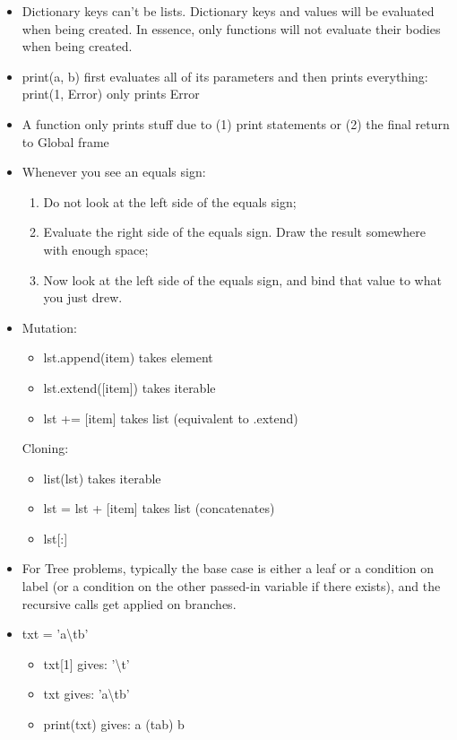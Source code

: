 \documentclass{article}
\begin{document}
\begin{itemize}
	\item Dictionary keys can't be lists. Dictionary keys and values will be evaluated when being created. In essence, only functions will not evaluate their bodies when being created.
	\item print(a, b) first evaluates all of its parameters and then prints everything: print(1, Error) only prints Error
	\item A function only prints stuff due to (1) print statements or (2) the final return to Global frame
	\item Whenever you see an equals sign:
	\begin{enumerate}
		\item Do not look at the left side of the equals sign;
		\item Evaluate the right side of the equals sign. Draw the result somewhere with enough space;
		\item Now look at the left side of the equals sign, and bind that value to what you just drew.
	\end{enumerate}
	\item Mutation:
	\begin{itemize}
		\item lst.append(item) takes element
		\item lst.extend([item]) takes iterable
		\item lst += [item] takes list (equivalent to .extend)
	\end{itemize}
	Cloning:
	\begin{itemize}
		\item list(lst) takes iterable
		\item lst = lst + [item] takes list (concatenates)
		\item lst[:]
	\end{itemize}
	\item For Tree problems, typically the base case is either a leaf or a condition on label (or a condition on the other passed-in variable if there exists), and the recursive calls get applied on branches.
	\item txt = 'a\textbackslash tb'
	\begin{itemize}
		\item txt[1] gives: '\textbackslash t'
		\item txt gives: 'a\textbackslash tb'
		\item print(txt) gives: a (tab) b
	\end{itemize}

\end{itemize}
\end{document}
